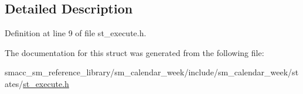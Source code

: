 \subsection{Detailed Description}


Definition at line 9 of file st\+\_\+execute.\+h.



The documentation for this struct was generated from the following file\+:\begin{DoxyCompactItemize}
\item 
smacc\+\_\+sm\+\_\+reference\+\_\+library/sm\+\_\+calendar\+\_\+week/include/sm\+\_\+calendar\+\_\+week/states/\hyperlink{sm__calendar__week_2include_2sm__calendar__week_2states_2st__execute_8h}{st\+\_\+execute.\+h}\end{DoxyCompactItemize}
